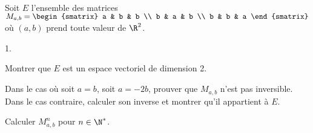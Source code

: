 \documentclass[11pt]{article}%
\begin{document}
\begin{exerciceSP}~\\
  Soit $E$ l'ensemble des matrices $M_{a,b} = 
  \begin{smatrix} 
    a & b & b \\ 
    b & a & b \\ 
    b & b & a 
  \end{smatrix}$ où $(a,b)$ prend toute valeur de $\R^2$.
  \begin{noliste}{1.}
    \setlength{\itemsep}{2mm}
  \item Montrer que $E$ est un espace vectoriel de dimension 2.
  \item Dans le cas où soit $a = b$, soit $a = -2b$, prouver que
    $M_{a,b}$ n'est pas inversible. \\
    Dans le cas contraire, calculer son inverse et montrer qu'il
    appartient à $E$.
  \item Calculer $M_{a,b}^n$ pour $n \in \N^*$.
  \end{noliste}
\end{exerciceSP}


\newpage


\end{document}
